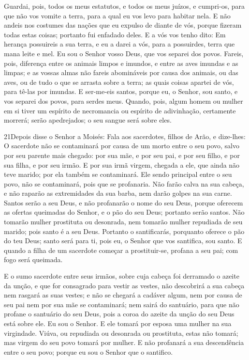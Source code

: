 Guardai, pois, todos os meus estatutos, e todos os meus juízos, e
cumpri-os, para que não vos vomite a terra, para a qual eu vos levo
para habitar nela. E não andeis nos costumes das nações que
eu expulso de diante de vós, porque fizeram todas estas coisas;
portanto fui enfadado deles. E a vós vos tenho dito: Em
herança possuireis a sua terra, e eu a darei a vós, para a
possuirdes, terra que mana leite e mel. Eu sou o Senhor vosso Deus,
que vos separei dos povos. Fareis, pois, diferença entre os
animais limpos e imundos, e entre as aves imundas e as limpas; e as
vossas almas não fareis abomináveis por causa dos animais, ou das
aves, ou de tudo o que se arrasta sobre a terra; as quais coisas
apartei de vós, para tê-las por imundas. E ser-me-eis santos,
porque eu, o Senhor, sou santo, e vos separei dos povos, para serdes
meus. Quando, pois, algum homem ou mulher em si tiver um
espírito de necromancia ou espírito de adivinhação, certamente
morrerá; serão apedrejados; o seu sangue será sobre eles.

\medskip

\lettrine{21} Depois disse o Senhor a Moisés: Fala aos
sacerdotes, filhos de Arão, e dize-lhes: O sacerdote não se
contaminará por causa de um morto entre o seu povo, salvo por
seu parente mais chegado: por sua mãe, e por seu pai, e por seu
filho, e por sua filha, e por seu irmão. E por sua irmã virgem,
chegada a ele, que ainda não teve marido; por ela também se
contaminará. Ele sendo principal entre o seu povo, não se
contaminará, pois que se profanaria. Não farão calva na sua
cabeça, e não raparão as extremidades da sua barba, nem darão golpes
na sua carne. Santos serão a seu Deus, e não profanarão o nome
do seu Deus, porque oferecem as ofertas queimadas do Senhor, e o pão
do seu Deus; portanto serão santos. Não tomarão mulher
prostituta ou desonrada, nem tomarão mulher repudiada de seu marido;
pois santo é a seu Deus. Portanto o santificarás, porquanto
oferece o pão do teu Deus; santo será para ti, pois eu, o Senhor que
vos santifica, sou santo. E quando a filha de um sacerdote
começar a prostituir-se, profana a seu pai; com fogo será queimada.

E o sumo sacerdote entre seus irmãos, sobre cuja cabeça foi
derramado o azeite da unção, e que for consagrado para vestir as
vestes, não descobrirá a sua cabeça nem rasgará as suas vestes;
e não se chegará a cadáver algum, nem por causa de seu pai
nem por sua mãe se contaminará; nem sairá do santuário, para
que não profane o santuário do seu Deus, pois a coroa do azeite da
unção do seu Deus está sobre ele. Eu sou o Senhor. E ele
tomará por esposa uma mulher na sua virgindade. Viúva, ou
repudiada ou desonrada ou prostituta, estas não tomará; mas virgem
do seu povo tomará por mulher. E não profanará a sua
descendência entre o seu povo; porque eu sou o Senhor que o
santifico.

